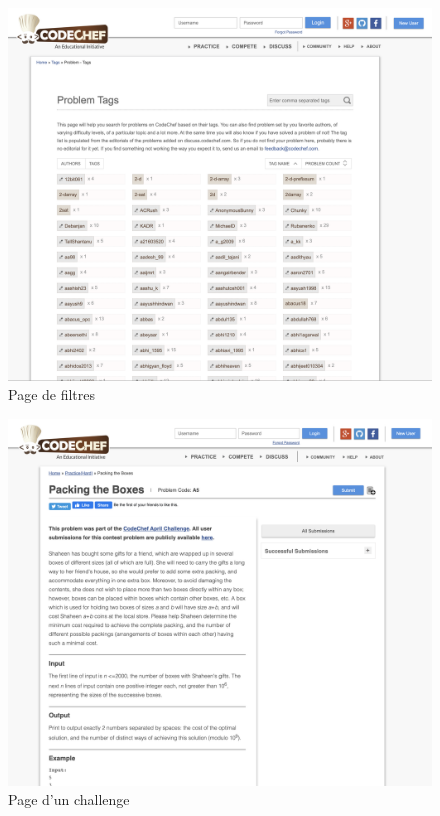 \begin{figure}[H]
    \includegraphics[width=\textwidth,height=0.45\textheight,keepaspectratio]{images/comparison/codechef-2.png}
    \centering
    \caption[Codechef : page de filtres]{Page de filtres}
\end{figure}

\begin{figure}[H]
    \includegraphics[width=\textwidth,height=0.45\textheight,keepaspectratio]{images/comparison/codechef-3.png}
    \centering
    \caption[Codechef : page d'un challenge]{Page d'un challenge}
\end{figure}

